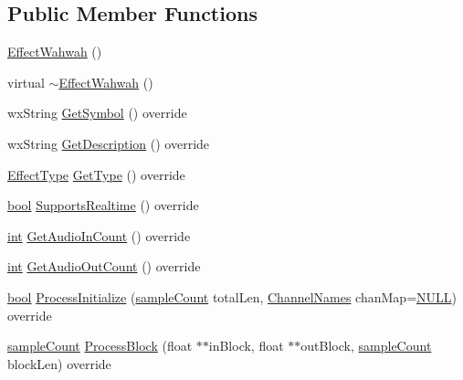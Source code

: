 \subsection*{Public Member Functions}
\begin{DoxyCompactItemize}
\item 
\hyperlink{class_effect_wahwah_a1d959757b28e80732bacde7b99826d79}{Effect\+Wahwah} ()
\item 
virtual \hyperlink{class_effect_wahwah_ac62f013debc935b545866f36944457ee}{$\sim$\+Effect\+Wahwah} ()
\item 
wx\+String \hyperlink{class_effect_wahwah_a5f29a1b116f719440a6581654109a681}{Get\+Symbol} () override
\item 
wx\+String \hyperlink{class_effect_wahwah_ae24c9ec25bf107d4902958f2d857c856}{Get\+Description} () override
\item 
\hyperlink{_effect_interface_8h_a4809a7bb3fd1a421902a667cc1405d43}{Effect\+Type} \hyperlink{class_effect_wahwah_a0d88d10a4b34d33c32b8cb464a9d9aa9}{Get\+Type} () override
\item 
\hyperlink{mac_2config_2i386_2lib-src_2libsoxr_2soxr-config_8h_abb452686968e48b67397da5f97445f5b}{bool} \hyperlink{class_effect_wahwah_a011e75206ccb3b06c0d622cce2962bea}{Supports\+Realtime} () override
\item 
\hyperlink{xmltok_8h_a5a0d4a5641ce434f1d23533f2b2e6653}{int} \hyperlink{class_effect_wahwah_ae4a2fd020638e8eba465163edb0313a3}{Get\+Audio\+In\+Count} () override
\item 
\hyperlink{xmltok_8h_a5a0d4a5641ce434f1d23533f2b2e6653}{int} \hyperlink{class_effect_wahwah_a19f3263d9e053f2c5afb13b609be286e}{Get\+Audio\+Out\+Count} () override
\item 
\hyperlink{mac_2config_2i386_2lib-src_2libsoxr_2soxr-config_8h_abb452686968e48b67397da5f97445f5b}{bool} \hyperlink{class_effect_wahwah_a97dc1228b1942ef4c10622772e043535}{Process\+Initialize} (\hyperlink{include_2audacity_2_types_8h_afa427e1f521ea5ec12d054e8bd4d0f71}{sample\+Count} total\+Len, \hyperlink{include_2audacity_2_types_8h_a4f0f42a04250c39bbe0ce6cb26aa3b48}{Channel\+Names} chan\+Map=\hyperlink{px__mixer_8h_a070d2ce7b6bb7e5c05602aa8c308d0c4}{N\+U\+LL}) override
\item 
\hyperlink{include_2audacity_2_types_8h_afa427e1f521ea5ec12d054e8bd4d0f71}{sample\+Count} \hyperlink{class_effect_wahwah_a4a11cef45a6d4373ff8ca9118381eadc}{Process\+Block} (float $\ast$$\ast$in\+Block, float $\ast$$\ast$out\+Block, \hyperlink{include_2audacity_2_types_8h_afa427e1f521ea5ec12d054e8bd4d0f71}{sample\+Count} block\+Len) override

\end{DoxyCompactItemize}

